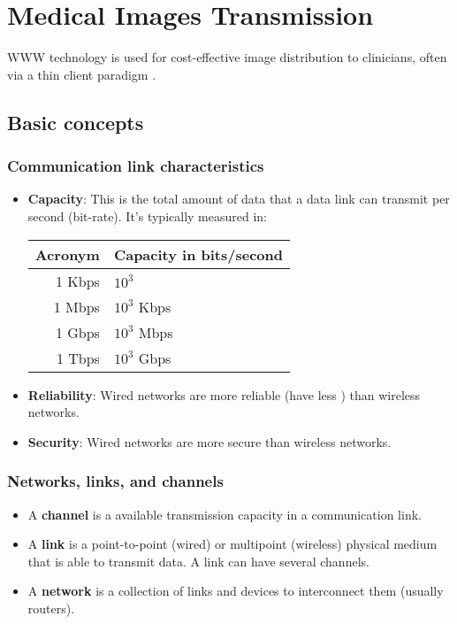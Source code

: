 \part{Medical Images Transmission}

WWW technology is used for cost-effective image distribution to clinicians, often via a thin client paradigm \cite{bushberg2011essential}.

\chapter{Basic concepts}

\section{Communication link characteristics}
\begin{itemize}
\item \textbf{Capacity}: This is the total amount of data that a
  data link can transmit per second (bit-rate). It's typically measured in:
  \begin{tabular}{r|l}
    Acronym & Capacity in bits/second\\
    \hline
    1 Kbps & $10^3$\\
    1 Mbps & $10^3$ Kbps\\
    1 Gbps & $10^3$ Mbps\\
    1 Tbps & $10^3$ Gbps
  \end{tabular}
\item \textbf{Reliability}: Wired networks are more reliable
(have less ) than wireless networks.
\item \textbf{Security}: Wired networks are more secure than wireless
networks.
\end{itemize}

\section{Networks, links, and channels}
\begin{itemize}
\item A \textbf{channel} is a available transmission capacity in a communication link.
\item A \textbf{link} is a point-to-point (wired) or multipoint
(wireless) physical medium that is able to transmit data. A link can have several channels.
\item A \textbf{network} is a collection of links and devices to
interconnect them (usually routers).
\end{itemize}


